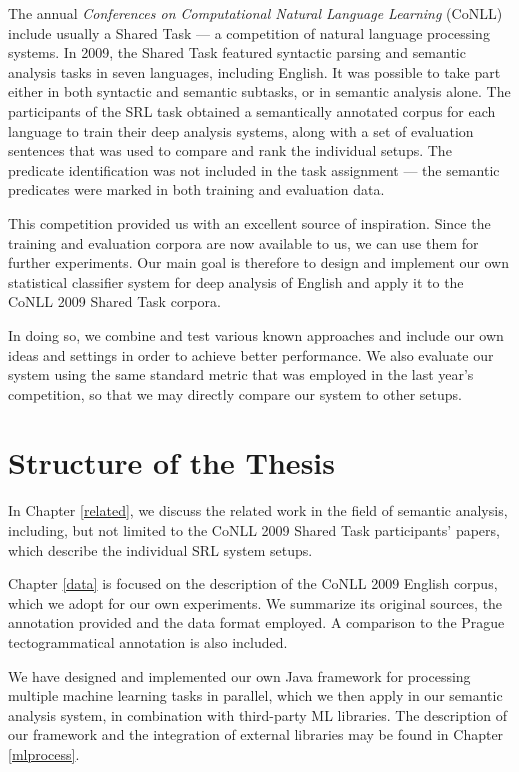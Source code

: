 \documentclass[12pt,notitlepage]{report}
\begin{document}
The annual \emph{Conferences on Computational Natural Language Learning} (CoNLL) include usually a Shared Task --- a competition of natural language processing systems. In 2009, the Shared Task \citep{hajic09} featured syntactic parsing and semantic analysis tasks in seven languages, including English. It was possible to take part either in both syntactic and semantic subtasks, or in semantic analysis alone. The participants of the SRL task obtained a semantically annotated corpus for each language to train their deep analysis systems, along with a set of evaluation sentences that was used to compare and rank the individual setups. The predicate identification was not included in the task assignment --- the semantic predicates were marked in both training and evaluation data.

This competition provided us with an excellent source of inspiration. Since the training and evaluation corpora are now available to us, we can use them for further experiments. Our main goal is therefore to design and implement our own statistical classifier system for deep analysis of English and apply it to the CoNLL 2009 Shared Task corpora. 

In doing so, we combine and test various known approaches and include our own ideas and settings in order to achieve better performance. We also evaluate our system using the same standard metric that was employed in the last year's competition, so that we may directly compare our system to other setups.

\section{Structure of the Thesis}

In Chapter \ref{related}, we discuss the related work in the field of semantic analysis, including, but not limited to the CoNLL 2009 Shared Task participants' papers, which describe the individual SRL system setups.

Chapter \ref{data} is focused on the description of the CoNLL 2009 English corpus, which we adopt for our own experiments. We summarize its original sources, the annotation provided and the data format employed. A comparison to the Prague tectogrammatical annotation \citep{cinkova09} is also included.

We have designed and implemented our own Java framework for processing multiple machine learning tasks in parallel, which we then apply in our semantic analysis system, in combination with third-party ML libraries. The description of our framework and the integration of external libraries may be found in Chapter \ref{mlprocess}. 
\end{document}
